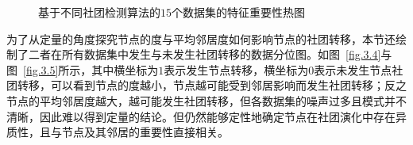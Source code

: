 \begin{figure}[!htbp]
	\caption{基于不同社团检测算法的$15$个数据集的特征重要性热图}
	\label{fig.3.3}
\end{figure}

为了从定量的角度探究节点的度与平均邻居度如何影响节点的社团转移，本节还绘制了二者在所有数据集中发生与未发生社团转移的数据分位图。如图~\ref{fig.3.4}与图~\ref{fig.3.5}所示，其中横坐标为$1$表示发生节点转移，横坐标为$0$表示未发生节点社团转移，可以看到节点的度越小，节点越可能受到邻居影响而发生社团转移；反之节点的平均邻居度越大，越可能发生社团转移，但各数据集的噪声过多且模式并不清晰，因此难以得到定量的结论。但仍然能够定性地确定节点在社团演化中存在异质性，且与节点及其邻居的重要性直接相关。

